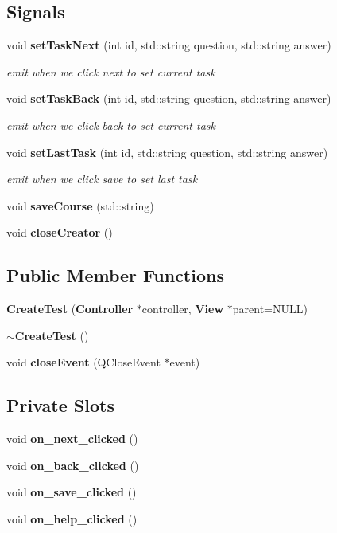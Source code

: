\subsection*{Signals}
\begin{DoxyCompactItemize}
\item 
void {\bf set\-Task\-Next} (int id, std\-::string question, std\-::string answer)
\begin{DoxyCompactList}\small\item\em emit when we click next to set current task \end{DoxyCompactList}\item 
void {\bf set\-Task\-Back} (int id, std\-::string question, std\-::string answer)
\begin{DoxyCompactList}\small\item\em emit when we click back to set current task \end{DoxyCompactList}\item 
void {\bf set\-Last\-Task} (int id, std\-::string question, std\-::string answer)
\begin{DoxyCompactList}\small\item\em emit when we click save to set last task \end{DoxyCompactList}\item 
void {\bf save\-Course} (std\-::string)
\item 
void {\bf close\-Creator} ()
\end{DoxyCompactItemize}
\subsection*{Public Member Functions}
\begin{DoxyCompactItemize}
\item 
{\bf Create\-Test} ({\bf Controller} $\ast$controller, {\bf View} $\ast$parent=N\-U\-L\-L)
\item 
{\bf $\sim$\-Create\-Test} ()
\item 
void {\bf close\-Event} (Q\-Close\-Event $\ast$event)
\end{DoxyCompactItemize}
\subsection*{Private Slots}
\begin{DoxyCompactItemize}
\item 
void {\bf on\-\_\-next\-\_\-clicked} ()
\item 
void {\bf on\-\_\-back\-\_\-clicked} ()
\item 
void {\bf on\-\_\-save\-\_\-clicked} ()
\item 
void {\bf on\-\_\-help\-\_\-clicked} ()
\end{DoxyCompactItemize}
